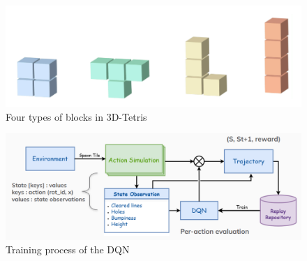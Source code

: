 \begin{figure}
    \centering
    \includegraphics[width=0.5\linewidth]{images/4Blocks.png}
    \caption{Four types of blocks in 3D-Tetris}
    \label{fig:4Blocks}
\end{figure}

\begin{figure}
    \centering
    \includegraphics[width=0.75\linewidth]{images/Work-flow.png}
    \caption{Training process of the DQN}
    \label{fig:Workflow}
\end{figure}
